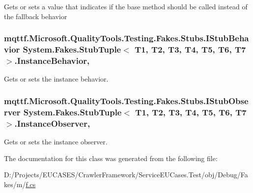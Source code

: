 Gets or sets a value that indicates if the base method should be called instead of the fallback behavior

\hypertarget{class_system_1_1_fakes_1_1_stub_tuple_3_01_t1_00_01_t2_00_01_t3_00_01_t4_00_01_t5_00_01_t6_00_01_t7_01_4_a1a07f09c2bd61827f428c483d1ddc1af}{
\subsubsection[{Instance\-Behavior}]{\setlength{\rightskip}{0pt plus 5cm}mqttf.\-Microsoft.\-Quality\-Tools.\-Testing.\-Fakes.\-Stubs.\-I\-Stub\-Behavior System.\-Fakes.\-Stub\-Tuple$<$ T1, T2, T3, T4, T5, T6, T7 $>$.Instance\-Behavior\hspace{0.3cm}{\ttfamily [get]}, {\ttfamily [set]}}}\label{class_system_1_1_fakes_1_1_stub_tuple_3_01_t1_00_01_t2_00_01_t3_00_01_t4_00_01_t5_00_01_t6_00_01_t7_01_4_a1a07f09c2bd61827f428c483d1ddc1af}


Gets or sets the instance behavior.

\hypertarget{class_system_1_1_fakes_1_1_stub_tuple_3_01_t1_00_01_t2_00_01_t3_00_01_t4_00_01_t5_00_01_t6_00_01_t7_01_4_ab126e7555230d832bdd3b30b7168b858}{
\subsubsection[{Instance\-Observer}]{\setlength{\rightskip}{0pt plus 5cm}mqttf.\-Microsoft.\-Quality\-Tools.\-Testing.\-Fakes.\-Stubs.\-I\-Stub\-Observer System.\-Fakes.\-Stub\-Tuple$<$ T1, T2, T3, T4, T5, T6, T7 $>$.Instance\-Observer\hspace{0.3cm}{\ttfamily [get]}, {\ttfamily [set]}}}\label{class_system_1_1_fakes_1_1_stub_tuple_3_01_t1_00_01_t2_00_01_t3_00_01_t4_00_01_t5_00_01_t6_00_01_t7_01_4_ab126e7555230d832bdd3b30b7168b858}


Gets or sets the instance observer.



The documentation for this class was generated from the following file\-:\begin{DoxyCompactItemize}
\item 
D\-:/\-Projects/\-E\-U\-C\-A\-S\-E\-S/\-Crawler\-Framework/\-Service\-E\-U\-Cases.\-Test/obj/\-Debug/\-Fakes/m/\hyperlink{m_2f_8cs}{f.\-cs}\end{DoxyCompactItemize}
